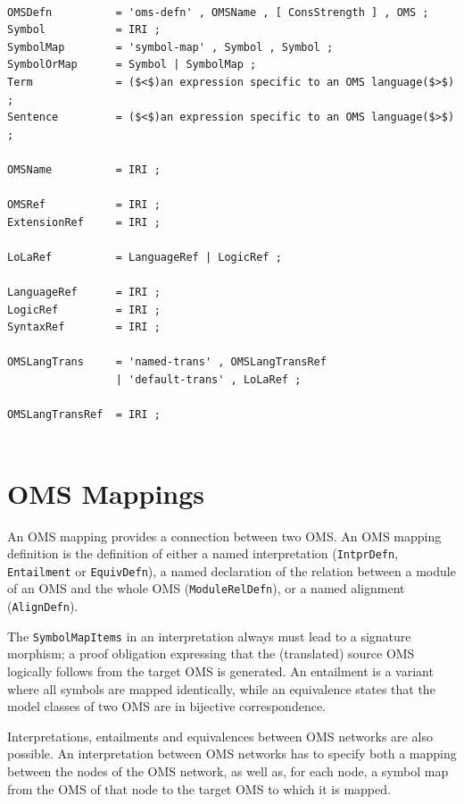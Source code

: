 \documentclass[10pt,fleqn,%
\ifpretendfinal
final%
\else
draft%
\fi,
]{scrreprt}
\newcommand{\red}[1]{#1} %
\newcommand*{\termref}[1]{\index{#1}#1\xspace}
\newcommand*{\syntax}[1]{\texttt{#1}}
\newcommand{\sclause}[1]{\section{#1}}
\begin{document}
\begin{lstlisting}[language=ebnf,escapeinside={()}]  % abstract syntax

OMSDefn          = 'oms-defn' , OMSName , [ ConsStrength ] , OMS ;
Symbol           = IRI ;
SymbolMap        = 'symbol-map' , Symbol , Symbol ;
SymbolOrMap      = Symbol | SymbolMap ;
Term             = ($<$)an expression specific to an OMS language($>$) ;
Sentence         = ($<$)an expression specific to an OMS language($>$) ;
                 
OMSName          = IRI ;
                 
OMSRef           = IRI ;
ExtensionRef     = IRI ;
                 
LoLaRef          = LanguageRef | LogicRef ;
                 
LanguageRef      = IRI ;
LogicRef         = IRI ;
SyntaxRef        = IRI ;
                 
OMSLangTrans     = 'named-trans' , OMSLangTransRef
                 | 'default-trans' , LoLaRef ; 
                 
OMSLangTransRef  = IRI ;
                 
\end{lstlisting}


\sclause{OMS Mappings}\label{c:oms-mappings}

An OMS mapping provides a connection between two OMS. An OMS mapping definition is the definition of 
either a named interpretation (\syntax{IntprDefn}, \red{\syntax{Entailment}} or 
\syntax{EquivDefn}), a named declaration of the  relation between a module of an OMS and the whole 
OMS (\syntax{ModuleRelDefn}), or a named \termref{alignment} (\syntax{AlignDefn}).

The \syntax{SymbolMapItems} in an interpretation always must lead to a signature morphism; a proof 
obligation expressing that the (translated) source OMS logically follows from the target OMS is 
generated.  \red{An entailment is a variant where all symbols are mapped identically, while an 
equivalence states that the model classes of two OMS are in bijective correspondence.}

\red{
Interpretations, entailments and equivalences between OMS networks are also possible. An 
interpretation between OMS networks has to specify both a mapping between the nodes of the OMS 
network, as well as, for each node, a symbol map from the OMS of that node to the target OMS to 
which it is mapped.
}
\end{document}
